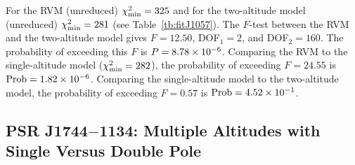 For the RVM (unreduced) $\chi^2_{\rm{min}}=325$ and for the 
two-altitude model (unreduced) $\chi^2_{\rm{min}}=281$
(see Table~\ref{tb:fitJ1057}).
The $F$-test between the RVM and the two-altitude 
model gives $F=12.50$, DOF$_1=2$, and DOF$_2=160$. The probability of
exceeding this $F$ is $P=8.78\times 10^{-6}$. Comparing the RVM 
to the single-altitude model ($\chi^2_{\rm{min}}=282$), the
probability of exceeding $F=24.55$ is $\rm{Prob}=1.82\times 10^{-6}$.  
Comparing the single-altitude model to the two-altitude model, the
probability of exceeding $F=0.57$ is $\rm{Prob}=4.52\times 10^{-1}$.



\subsection{PSR J1744$-$1134: Multiple Altitudes with Single Versus Double Pole}
\label{sec:J1744}

